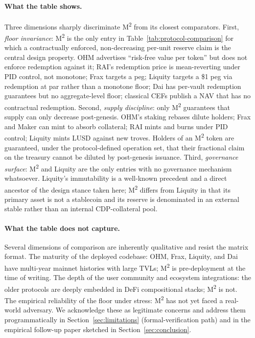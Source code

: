 \paragraph{What the table shows.} Three dimensions sharply discriminate M\textsuperscript{2} from its closest comparators. First, \emph{floor invariance}: M\textsuperscript{2} is the only entry in Table~\ref{tab:protocol-comparison} for which a contractually enforced, non-decreasing per-unit reserve claim is the central design property. OHM advertises ``risk-free value per token'' but does not enforce redemption against it; RAI's redemption price is mean-reverting under PID control, not monotone; Frax targets a peg; Liquity targets a \$1 peg via redemption at par rather than a monotone floor; Dai has per-vault redemption guarantees but no aggregate-level floor; classical CEFs publish a NAV that has no contractual redemption. Second, \emph{supply discipline}: only M\textsuperscript{2} guarantees that supply can only decrease post-genesis. OHM's staking rebases dilute holders; Frax and Maker can mint to absorb collateral; RAI mints and burns under PID control; Liquity mints LUSD against new troves. Holders of an M\textsuperscript{2} token are guaranteed, under the protocol-defined operation set, that their fractional claim on the treasury cannot be diluted by post-genesis issuance. Third, \emph{governance surface}: M\textsuperscript{2} and Liquity are the only entries with no governance mechanism whatsoever. Liquity's immutability is a well-known precedent and a direct ancestor of the design stance taken here; M\textsuperscript{2} differs from Liquity in that its primary asset is not a stablecoin and its reserve is denominated in an external stable rather than an internal CDP-collateral pool.

\paragraph{What the table does not capture.} Several dimensions of comparison are inherently qualitative and resist the matrix format. The maturity of the deployed codebase: OHM, Frax, Liquity, and Dai have multi-year mainnet histories with large TVLs; M\textsuperscript{2} is pre-deployment at the time of writing. The depth of the user community and ecosystem integrations: the older protocols are deeply embedded in DeFi compositional stacks; M\textsuperscript{2} is not. The empirical reliability of the floor under stress: M\textsuperscript{2} has not yet faced a real-world adversary. We acknowledge these as legitimate concerns and address them programmatically in Section~\ref{sec:limitations} (formal-verification path) and in the empirical follow-up paper sketched in Section~\ref{sec:conclusion}.

